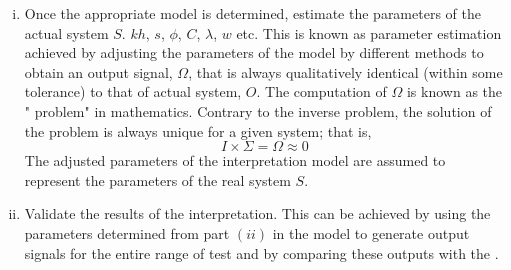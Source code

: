 \documentclass{llncs}
\numberwithin{equation}{section}
\numberwithin{figure}{section}
\numberwithin{table}{section}
\begin{document}
\begin{enumerate}[(i)]
        \item Once the appropriate model is determined, estimate the parameters of the actual system $S$.  $kh$, $s$, $\phi$, $C$, $\lambda$, $w$ etc. This is known as parameter estimation achieved by adjusting the parameters of the model by different  methods to obtain an output signal, $\Omega$, that is always qualitatively identical (within some tolerance) to that of  actual system, $O$. The computation of $\Omega$ is known as
            the " problem" in mathematics. Contrary to the inverse problem, the solution of the  problem is always unique for a given system; that is,
        \begin{equation}
            I\times \Sigma =\Omega \approx 0
            \label{ForP}
        \end{equation}
            The adjusted parameters of the interpretation model are assumed to represent the parameters of the real system $S$.  
        \item Validate the results of the interpretation. This can be achieved by using the parameters determined from part $(ii)$ in the model
              to generate output signals for the entire range of  test and by comparing these outputs with the .
    \end{enumerate}
\end{document}
